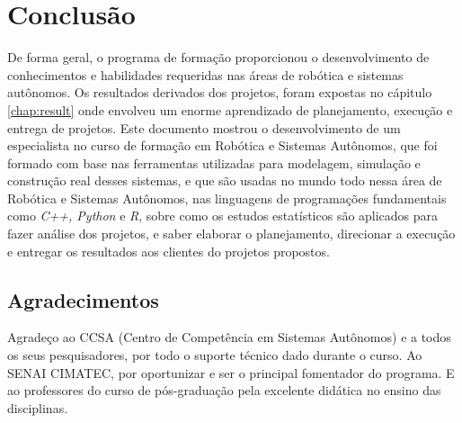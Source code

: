 \chapter{Conclusão}
\label{chap:conc}

De forma geral, o programa de formação proporcionou o desenvolvimento de conhecimentos e habilidades requeridas nas áreas de robótica e sistemas autônomos. Os resultados derivados dos projetos, foram expostas no cápitulo \ref{chap:result} onde envolveu um enorme aprendizado de planejamento, execução e entrega de projetos.
Este documento mostrou o desenvolvimento de um especialista no curso de formação em Robótica e Sistemas Autônomos, que foi formado com base nas ferramentas utilizadas para modelagem, simulação e construção real desses sistemas, e que são usadas no mundo todo nessa área de Robótica e Sistemas Autônomos, nas linguagens de programações fundamentais como \textit{C++, Python} e \textit{R}, sobre como os estudos estatísticos são aplicados para fazer análise dos projetos, e saber elaborar o planejamento, direcionar a execução e entregar os resultados aos clientes do projetos propostos. 


\section{Agradecimentos}
\label{sec:consid}

Agradeço ao CCSA (Centro de Competência em Sistemas Autônomos) e a todos os seus pesquisadores, por todo o suporte técnico dado durante o curso.
Ao SENAI CIMATEC, por oportunizar e ser o principal fomentador do programa.  
E ao professores do curso de pós-graduação pela excelente didática no ensino das disciplinas.
